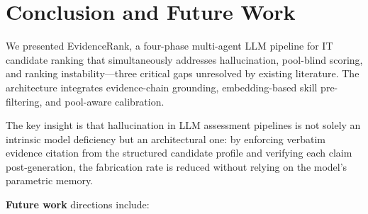 \documentclass[journal]{IEEEtran}
\begin{document}
\section{Conclusion and Future Work}
\label{sec:conclusion}

We presented EvidenceRank, a four-phase multi-agent LLM pipeline for IT candidate
ranking that simultaneously addresses hallucination, pool-blind scoring, and
ranking instability—three critical gaps unresolved by existing literature.
The architecture integrates evidence-chain grounding, embedding-based skill
pre-filtering, and pool-aware calibration.

The key insight is that hallucination in LLM assessment pipelines is not solely an
intrinsic model deficiency but an architectural one: by enforcing verbatim evidence
citation from the structured candidate profile and verifying each claim post-generation,
the fabrication rate is reduced without relying on the model's parametric memory.

\textbf{Future work} directions include:
\end{document}
